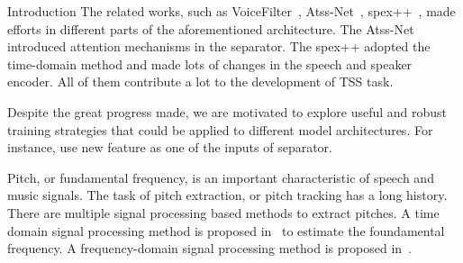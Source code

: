 \documentclass[final]{beamer}
\newlength{\colwidth}
\begin{document}
\begin{frame}[t]
\begin{columns}[t]
\begin{column}{\colwidth}
\begin{block}{Introduction}
                    The related works, such as VoiceFilter~\cite{voicefilter}, Atss-Net~\cite{li20p_interspeech}, spex++~\cite{time_domain_speaker_ex_net, spex, spex+}, made efforts in different parts of the aforementioned architecture. The Atss-Net introduced attention mechanisms in the separator. The spex++ adopted the time-domain method and made lots of changes in the speech and speaker encoder. All of them contribute a lot to the development of TSS task.

                    Despite the great progress made, we are motivated to explore useful and robust training strategies that could be applied to different model architectures. For instance, use new feature as one of the inputs of separator.

                    Pitch, or fundamental frequency, is an important characteristic of speech and music signals.
                    The task of pitch extraction, or pitch tracking has a long history. There are multiple signal processing based methods to extract pitches. A time domain signal processing method is proposed in~\cite{yin} to estimate the foundamental frequency.
                    A frequency-domain signal processing method is proposed in~\cite{swipe}.


\end{block}
\end{column}
\end{columns}
\end{frame}
\end{document}
